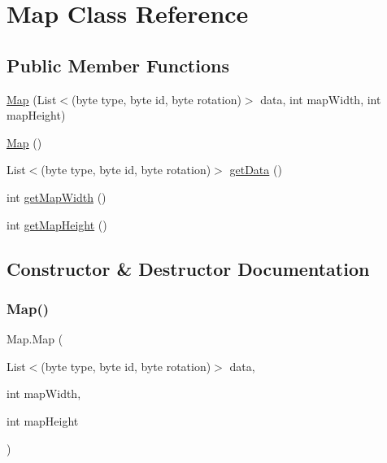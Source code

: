 \hypertarget{class_map}{}\section{Map Class Reference}
\label{class_map}
\subsection*{Public Member Functions}
\begin{DoxyCompactItemize}
\item 
\mbox{\hyperlink{class_map_a4b3deeffb063822663cd1a0299b9f16c}{Map}} (List$<$(byte type, byte id, byte rotation)$>$ data, int map\+Width, int map\+Height)
\item 
\mbox{\hyperlink{class_map_af020476bbce3b6eb3e74621d8503a957}{Map}} ()
\item 
List$<$(byte type, byte id, byte rotation)$>$ \mbox{\hyperlink{class_map_a6acb3dce930b94bf2ebf2828e1321748}{get\+Data}} ()
\item 
int \mbox{\hyperlink{class_map_a3076f3e98e0f0906f1b33cfe8ed63eea}{get\+Map\+Width}} ()
\item 
int \mbox{\hyperlink{class_map_a40c059a8f17911343281c8766d0ec072}{get\+Map\+Height}} ()
\end{DoxyCompactItemize}


\subsection{Constructor \& Destructor Documentation}
\mbox{\label{class_map_a4b3deeffb063822663cd1a0299b9f16c}} 
\subsubsection{\texorpdfstring{Map()}{Map()}\hspace{0.1cm}{\footnotesize\ttfamily [1/2]}}
{\footnotesize\ttfamily Map.\+Map (\begin{DoxyParamCaption}\item[{List$<$(byte type, byte id, byte rotation)$>$}]{data,  }\item[{int}]{map\+Width,  }\item[{int}]{map\+Height }\end{DoxyParamCaption})}

\mbox{\label{class_map_af020476bbce3b6eb3e74621d8503a957}} 
